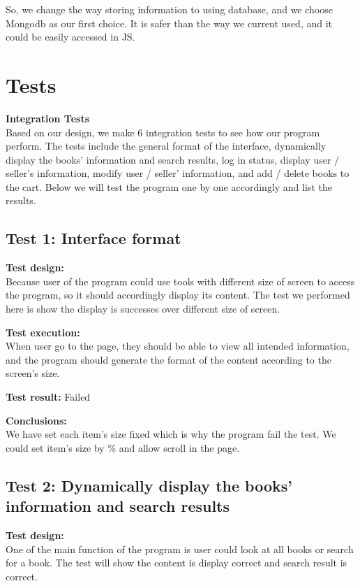 \documentclass[12pt]{article}
\begin{document}
	So, we change the way storing information to using database, and we choose Mongodb as our first choice. It is safer than the way we current used, and it could be easily accessed in JS.


	\section{Tests}
	\textbf{Integration Tests} \\
	Based on our design, we make 6 integration tests to see how our program perform. The tests include the general format of the interface, dynamically display the books’ information and search results, log in status, display user / seller’s information, modify user / seller’ information, and add / delete books to the cart. Below we will test the program one by one accordingly and list the results.


	\subsection{Test 1: Interface format}

	\textbf{Test design:} \\
	Because user of the program could use tools with different size of screen to access the program, so it should accordingly display its content. The test we performed here is show the display is successes over different size of screen.

	\textbf{Test execution:} \\
	When user go to the page, they should be able to view all intended information, and the program should generate the format of the content according to the screen’s size.

	\textbf{Test result: } Failed

	\textbf{Conclusions:} \\
	We have set each item’s size fixed which is why the program fail the test. We could set item’s size by \% and allow scroll in the page.


	\subsection{Test 2: Dynamically display the books' information and search results}

	\textbf{Test design:} \\
	One of the main function of the program is user could look at all books or search for a book. The test will show the content is display correct and search result is correct.
\end{document}
